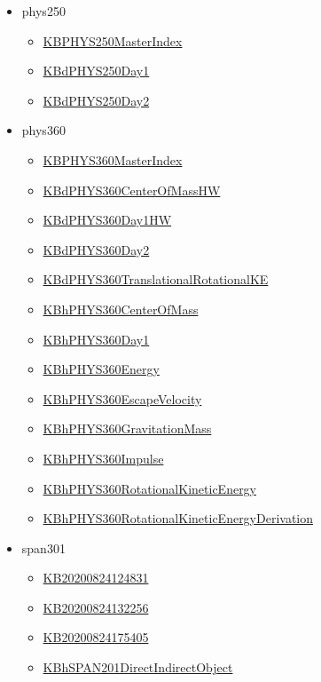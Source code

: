 \documentclass[11pt]{article}
\begin{document}
\begin{itemize}
\begin{itemize}
\end{itemize}
\item phys250
\begin{itemize}
\item \href{phys250/KBPHYS250MasterIndex.org}{KBPHYS250MasterIndex}
\item \href{phys250/KBdPHYS250Day1.org}{KBdPHYS250Day1}
\item \href{phys250/KBdPHYS250Day2.org}{KBdPHYS250Day2}
\end{itemize}
\item phys360
\begin{itemize}
\item \href{phys360/KBPHYS360MasterIndex.org}{KBPHYS360MasterIndex}
\item \href{phys360/KBdPHYS360CenterOfMassHW.org}{KBdPHYS360CenterOfMassHW}
\item \href{phys360/KBdPHYS360Day1HW.org}{KBdPHYS360Day1HW}
\item \href{phys360/KBdPHYS360Day2.org}{KBdPHYS360Day2}
\item \href{phys360/KBdPHYS360TranslationalRotationalKE.org}{KBdPHYS360TranslationalRotationalKE}
\item \href{phys360/KBhPHYS360CenterOfMass.org}{KBhPHYS360CenterOfMass}
\item \href{phys360/KBhPHYS360Day1.org}{KBhPHYS360Day1}
\item \href{phys360/KBhPHYS360Energy.org}{KBhPHYS360Energy}
\item \href{phys360/KBhPHYS360EscapeVelocity.org}{KBhPHYS360EscapeVelocity}
\item \href{phys360/KBhPHYS360GravitationMass.org}{KBhPHYS360GravitationMass}
\item \href{phys360/KBhPHYS360Impulse.org}{KBhPHYS360Impulse}
\item \href{phys360/KBhPHYS360RotationalKineticEnergy.org}{KBhPHYS360RotationalKineticEnergy}
\item \href{phys360/KBhPHYS360RotationalKineticEnergyDerivation.org}{KBhPHYS360RotationalKineticEnergyDerivation}
\end{itemize}
\item span301
\begin{itemize}
\item \href{span301/KB20200824124831.org}{KB20200824124831}
\item \href{span301/KB20200824132256.org}{KB20200824132256}
\item \href{span301/KB20200824175405.org}{KB20200824175405}
\item \href{span301/KBhSPAN201DirectIndirectObject.org}{KBhSPAN201DirectIndirectObject}

\end{itemize}
\end{itemize}
\end{document}
